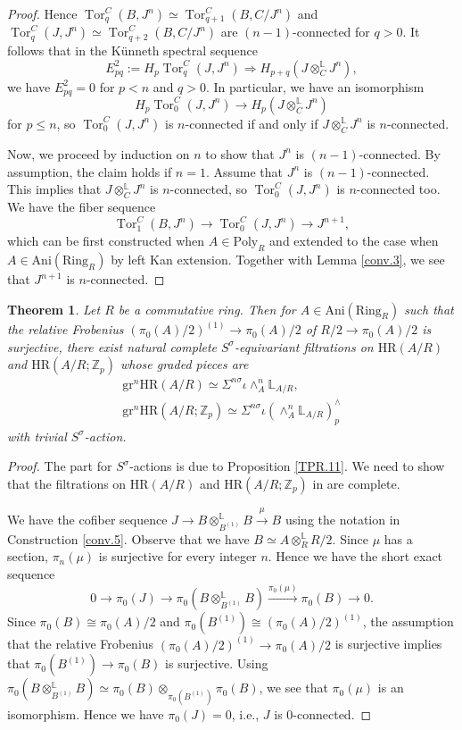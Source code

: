 \documentclass[10pt]{amsart}
\newtheorem{thm}{Theorem}[section]
\theoremstyle{definition}
\numberwithin{equation}{section}
\renewcommand{\L}{\mathbb{L}}
\newcommand{\Z}{\mathbb{Z}}
\newcommand{\Ani}{\mathrm{Ani}}
\newcommand{\Ring}{\mathrm{Ring}}
\newcommand{\Poly}{\mathrm{Poly}}
\newcommand{\gr}{\mathrm{gr}}
\DeclareMathOperator{\Tor}{\mathrm{Tor}}
\newcommand{\HR}{\mathrm{HR}}
\begin{document}
{\begin{proof}
Hence
$
\Tor_q^C(B,J^n)\simeq \Tor_{q+1}^C(B,C/J^n)$ and $\Tor_q^C(J,J^n)\simeq \Tor_{q+2}^C(B,C/J^n)$
are $(n-1)$-connected for $q>0$.
It follows that in the K\"unneth spectral sequence
\[
E_{pq}^2
:=
H_p\Tor_q^C(J,J^n)
\Rightarrow
H_{p+q}(J\otimes_C^\L J^n),
\]
we have $E_{pq}^2=0$ for $p<n$ and $q>0$.
In particular,
we have an isomorphism
\[
H_p \Tor_0^C(J, J^n)
\to
H_p(J\otimes_C^\L J^n)
\]
for $p\leq n$,
so $\Tor_0^C(J,J^n)$ is $n$-connected if and only if $J\otimes_C^\L J^n$ is $n$-connected.

Now, we proceed by induction on $n$ to show that $J^n$ is $(n-1)$-connected.
By assumption,
the claim holds if $n=1$.
Assume that $J^n$ is $(n-1)$-connected.
This implies that $J\otimes_C^\L J^n$ is $n$-connected,
so $\Tor_0^C(J,J^n)$ is $n$-connected too.
We have the fiber sequence
\[
\Tor_1^C(B,J^n)
\to
\Tor_0^C(J, J^n)
\to
J^{n+1},
\]
which can be first constructed when $A\in \Poly_R$ and extended to the case when $A\in \Ani(\Ring_R)$ by left Kan extension.
Together with Lemma \ref{conv.3},
we see that $J^{n+1}$ is $n$-connected.
\end{proof}




\begin{thm}
\label{geometric.6}
Let $R$ be a commutative ring.
Then for $A\in \Ani(\Ring_R)$ such that the relative Frobenius $(\pi_0(A)/2)^{(1)}\to \pi_0(A)/2$ of $R/2\to \pi_0(A)/2$ is surjective,
there exist natural complete $S^\sigma$-equivariant filtrations on $\HR(A/R)$ and $\HR(A/R;\Z_p)$ whose graded pieces are
\begin{gather*}
\gr^n \HR(A/R)
\simeq
\Sigma^{n\sigma}\iota \wedge_A^n \L_{A/R},
\\
\gr^n \HR(A/R;\Z_p)
\simeq
\Sigma^{n\sigma}\iota (\wedge_A^n \L_{A/R})_p^\wedge
\end{gather*}
with trivial $S^\sigma$-action.
\end{thm}
\begin{proof}
The part for $S^\sigma$-actions is due to Proposition \ref{TPR.11}.
We need to show that the filtrations on $\HR(A/R)$ and $\HR(A/R;\Z_p)$ in \cite[Theorem 4.32, Corollary 4.40]{HP} are complete.

We have the cofiber sequence
\(
J\to B\otimes_{B^{(1)}}^\L B \xrightarrow{\mu} B
\)
using the notation in Construction \ref{conv.5}.
Observe that we have $B\simeq A\otimes_R^\L R/2$.
Since $\mu$ has a section,
$\pi_n(\mu)$ is surjective for every integer $n$.
Hence we have the short exact sequence
\[
0\to \pi_0(J)\to \pi_0(B\otimes_{B^{(1)}}^\L B) \xrightarrow{\pi_0(\mu)} \pi_0(B)\to 0.
\]
Since $\pi_0(B)\cong \pi_0(A)/2$ and $\pi_0(B^{(1)})\cong (\pi_0(A)/2)^{(1)}$, the assumption that the relative Frobenius $(\pi_0(A)/2)^{(1)}\to \pi_0(A)/2$ is surjective implies that $\pi_0(B^{(1)})\to \pi_0(B)$ is surjective.
Using $\pi_0(B\otimes_{B^{(1)}}^\L B)\simeq \pi_0(B)\otimes_{\pi_0(B^{(1)})}\pi_0(B)$,
we see that $\pi_0(\mu)$ is an isomorphism.
Hence we have $\pi_0(J)=0$, i.e., $J$ is $0$-connected.


\end{proof}}
\end{document}
